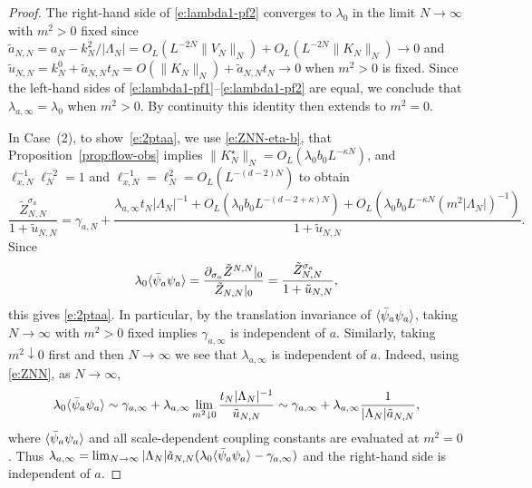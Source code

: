 \documentclass[11pt]{amsart}
\numberwithin{equation}{section}
\numberwithin{theorem}{section}
\newcommand{\1}{{\bf 1}}
\newcommand{\obs}{\star}
\newcommand{\Kobs}{K^\obs}
\newcommand{\ellxN}{\ell_{x,N}}
\newcommand{\OL}{O_L}
\begin{document}
\begin{proof}
  The right-hand side of \eqref{e:lambda1-pf2} converges to
  $\lambda_0$ in the limit $N\to\infty$ with $m^2>0$ fixed since
  $\tilde a_{N,N}= a_N - k_N^2/|\Lambda_N| =
  \OL(L^{-2N}\|V_N\|_N)+\OL(L^{-2N}\|K_N\|_N) \to 0$ and
  $\tilde u_{N,N}= k_N^0 + \tilde a_{N,N}t_N = O(\|K_N\|_N) + \tilde
  a_{N,N}t_N \to 0$ when $m^2>0$ is fixed.  Since the left-hand sides
  of \eqref{e:lambda1-pf1}--\eqref{e:lambda1-pf2} are equal, we
  conclude that $\lambda_{a,\infty}=\lambda_0$ when $m^2>0$. By
  continuity this identity then extends to $m^2=0$.  
  
  In Case~(2), to show~\eqref{e:2ptaa}, we use \eqref{e:ZNN-eta-b},
  that Proposition~\ref{prop:flow-obs} implies
  $\|\Kobs_N\|_N = \OL(\lambda_0b_0L^{-\kappa N})$, and
  $\ellxN^{-1}\ell_N^{-2} = 1$ and
  $\ellxN^{-1}= \ell_N^{2} = \OL(L^{-(d-2)N})$ to obtain
  \begin{equation}
    \frac{\tilde Z_{N,N}^{\sigma_a}}{1+\tilde u_{N,N}}
    = \gamma_{a,N} +
    \frac{\lambda_{a,\infty} t_N |\Lambda_N|^{-1}  + \OL(\lambda_0 b_0L^{-(d-2+\kappa)N}) + \OL( \lambda_0b_0 L^{-\kappa N} (m^{2}|\Lambda_N|)^{-1})
      }{1+\tilde u_{N,N}}.
    \end{equation}
    Since
    \begin{equation}
      \lambda_0 \langle \bar\psi_a\psi_a \rangle = \frac{\partial_{\sigma_a} \tilde Z^{N,N}|_0}{\tilde Z_{N,N}|_0} = \frac{\tilde  Z_{N,N}^{\sigma_a}}{1+\tilde  u_{N,N}},
    \end{equation}
    this gives \eqref{e:2ptaa}.  In particular, by the
    translation invariance of $\langle \bar\psi_a\psi_a \rangle$, taking $N\to\infty$
    with $m^2>0$ fixed implies $\gamma_{a,\infty}$ is independent of $a$.
    Similarly, taking $m^2\downarrow 0$ first and then $N\to\infty$ we see that $\lambda_{a,\infty}$
    is independent of $a$. Indeed, using \eqref{e:ZNN}, as $N\to\infty$,
    \begin{equation}
      \lambda_0 \langle \bar\psi_a\psi_a \rangle
      \sim \gamma_{a,\infty}+ \lambda_{a,\infty} \lim_{m^2\downarrow 0}\frac{t_N|\Lambda_N|^{-1}}{\tilde u_{N,N}}
      \sim
      \gamma_{a,\infty} + \lambda_{a,\infty}  \frac{1}{|\Lambda_N|\tilde a_{N,N}}
      ,
    \end{equation}
    where $\langle \bar\psi_a\psi_a \rangle$ and all scale-dependent coupling constants are evaluated at $m^2=0$.
    Thus $\lambda_{a,\infty} =\lim_{N\to\infty} |\Lambda_N|\tilde a_{N,N} (\lambda_0 \langle \bar\psi_a\psi_a \rangle-\gamma_{a,\infty})$
    and the right-hand side is independent of $a$.
\end{proof}
\end{document}
